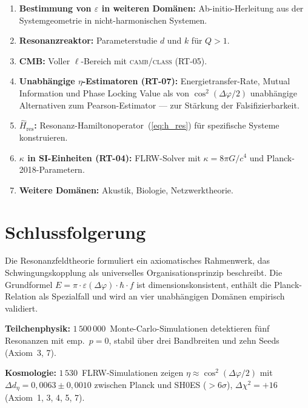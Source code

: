 \documentclass[12pt]{iopart}
\begin{document}
	\begin{enumerate}
		\item \textbf{Bestimmung von $\varepsilon$ in weiteren Dom\"anen:}
		Ab-initio-Herleitung aus der Systemgeometrie in nicht-harmonischen Systemen.
		
		\item \textbf{Resonanzreaktor:}
		Parameterstudie $d$ und $k$ f\"ur $Q > 1$.
		
		\item \textbf{CMB:}
		Voller $\ell$-Bereich mit
		\textsc{camb}/\textsc{class} (RT-05).
		
		\item \textbf{Unabh\"angige $\eta$-Estimatoren (RT-07):}
		Energietransfer-Rate, Mutual Information und Phase Locking Value
		als von $\cos^2(\Delta\varphi/2)$ unabh\"angige Alternativen
		zum Pearson-Estimator — zur St\"arkung der Falsifizierbarkeit.
		
		\item \textbf{$\hat{H}_{\mathrm{res}}$:}
		Resonanz-Hamiltonoperator~(\ref{eq:h_res})
		f\"ur spezifische Systeme konstruieren.
		
		\item \textbf{$\kappa$ in SI-Einheiten (RT-04):}
		FLRW-Solver mit $\kappa = 8\pi G/c^4$ und Planck-2018-Parametern.
		
		\item \textbf{Weitere Dom\"anen:}
		Akustik, Biologie, Netzwerktheorie.
	\end{enumerate}
	
	
	\section{Schlussfolgerung}
	
	Die Resonanzfeldtheorie formuliert ein axiomatisches
	Rahmenwerk, das Schwingungskopplung als universelles
	Organisationsprinzip beschreibt. Die Grundformel
	$E = \pi \cdot \varepsilon(\Delta\varphi) \cdot
	\hbar \cdot f$ ist dimensionskonsistent, enth\"alt die
	Planck-Relation als Spezialfall und wird an vier
	unabh\"angigen Dom\"anen empirisch validiert.
	
	\textbf{Teilchenphysik:}
	$1\,500\,000$~Monte-Carlo-Simulationen detektieren
	f\"unf Resonanzen mit emp.\ $p = 0$, stabil \"uber
	drei Bandbreiten und zehn Seeds (Axiom~3, 7).
	
	\textbf{Kosmologie:}
	$1\,530$~FLRW-Simulationen zeigen
	$\eta \approx \cos^2(\Delta\varphi/2)$ mit
	$\Delta d_\eta = 0{,}0063 \pm 0{,}0010$ zwischen
	Planck und SH0ES ($>6\sigma$),
	$\Delta\chi^2 = +16$ (Axiom~1, 3, 4, 5, 7).
	
\end{document}
